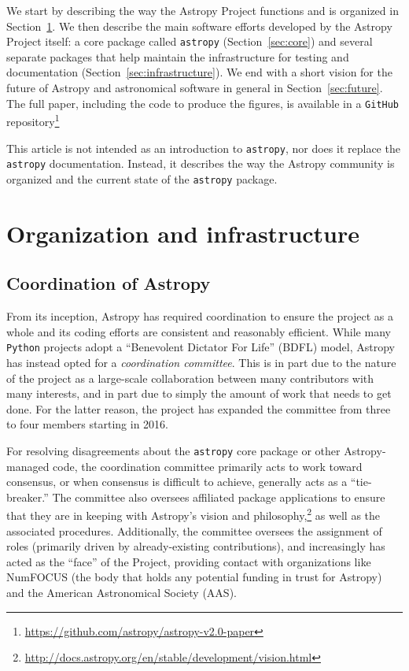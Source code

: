 \documentclass[modern]{aastex62}
\newcommand{\package}[1]{\texttt{#1}\xspace}
\newcommand{\github}{\package{GitHub}}
\newcommand{\python}{\package{Python}}
\newcommand{\astropy}{Astropy\xspace}
\newcommand{\astropypkg}{\package{astropy}}
\newcommand{\sectionname}{Section\xspace}
\begin{document}
We start by describing the way the \astropy Project functions and is organized
in \sectionname~\ref{sec:org}. We then describe the main software efforts
developed by the \astropy Project itself: a core package called \astropypkg
(\sectionname~\ref{sec:core}) and several separate packages that help maintain
the infrastructure for testing and documentation
(\sectionname~\ref{sec:infrastructure}). We end with a short vision for
the future of \astropy and astronomical software in general in
\sectionname~\ref{sec:future}. The full paper, including the code
to produce the figures, is available in a \github
repository\footnote{\url{https://github.com/astropy/astropy-v2.0-paper}}

This article is not intended as an introduction to \astropypkg, nor does it
replace the \astropypkg documentation. Instead, it describes the way the
\astropy community is organized and the current state of the \astropypkg
package.

\section{Organization and infrastructure}
\label{sec:org}

\subsection{Coordination of Astropy}
\label{sect:coordcom}
From its inception, \astropy has required coordination to ensure the project
as a whole and its coding efforts are consistent and reasonably efficient.
While many \python projects adopt a ``Benevolent Dictator For Life'' (BDFL)
model, \astropy has instead opted for a \emph{coordination committee}.  This
is in part due to the nature of the project as a large-scale collaboration
between many contributors with many interests, and in part due to simply the
amount of work that needs to get done.  For the latter reason, the
project has expanded the committee from three to four members starting in
2016.

For resolving disagreements about the \astropypkg core package or other \astropy-managed code, the coordination committee primarily acts to work toward consensus, or when consensus is difficult to achieve, generally acts as a ``tie-breaker.''
The committee also oversees affiliated package applications to ensure that they
are in keeping with \astropy's vision and
philosophy,\footnote{\url{http://docs.astropy.org/en/stable/development/vision.html}}
as well as the associated procedures.
Additionally, the committee oversees the assignment of roles (primarily driven by already-existing contributions), and increasingly has acted as the ``face'' of the Project, providing contact with organizations like NumFOCUS (the body that holds any potential funding in trust for \astropy) and the American Astronomical Society (AAS).
\end{document}
